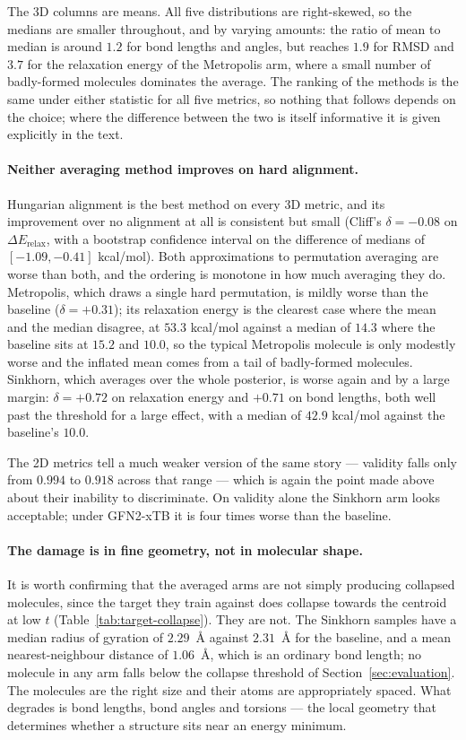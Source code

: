 The 3D columns are means. All five distributions are right-skewed, so the medians are smaller
throughout, and by varying amounts: the ratio of mean to median is around $1.2$ for bond lengths
and angles, but reaches $1.9$ for RMSD and $3.7$ for the relaxation energy of the Metropolis arm,
where a small number of badly-formed molecules dominates the average. The ranking of the methods is
the same under either statistic for all five metrics, so nothing that follows depends on the
choice; where the difference between the two is itself informative it is given explicitly in the
text.

\paragraph{Neither averaging method improves on hard alignment.}
Hungarian alignment is the best method on every 3D metric, and its improvement over no alignment at
all is consistent but small (Cliff's $\delta = -0.08$ on $\Delta E_{\text{relax}}$, with a bootstrap
confidence interval on the difference of medians of $[-1.09, -0.41]$ kcal/mol). Both approximations
to permutation averaging are worse than both, and the ordering is monotone in how much averaging
they do. Metropolis, which draws a single hard permutation, is mildly worse than the baseline
($\delta = +0.31$); its relaxation energy is the clearest case where the mean and the median
disagree, at $53.3$ kcal/mol against a median of $14.3$ where the baseline sits at $15.2$ and
$10.0$, so the typical Metropolis molecule is only modestly worse and the inflated mean comes from a
tail of badly-formed molecules. Sinkhorn, which averages over the whole posterior, is worse again
and by a large margin: $\delta = +0.72$ on relaxation energy and $+0.71$ on bond lengths, both well
past the threshold for a large effect, with a median of $42.9$ kcal/mol against the baseline's
$10.0$.

The 2D metrics tell a much weaker version of the same story --- validity falls only from $0.994$ to
$0.918$ across that range --- which is again the point made above about their inability to
discriminate. On validity alone the Sinkhorn arm looks acceptable; under GFN2-xTB it is four times
worse than the baseline.

\paragraph{The damage is in fine geometry, not in molecular shape.}
It is worth confirming that the averaged arms are not simply producing collapsed molecules, since
the target they train against does collapse towards the centroid at low $t$
(Table~\ref{tab:target-collapse}). They are not. The Sinkhorn samples have a median radius of
gyration of $2.29$~\AA{} against $2.31$~\AA{} for the baseline, and a mean nearest-neighbour
distance of $1.06$~\AA{}, which is an ordinary bond length; no molecule in any arm falls below the
collapse threshold of Section~\ref{sec:evaluation}. The molecules are the right size and their atoms
are appropriately spaced. What degrades is bond lengths, bond angles and torsions --- the local
geometry that determines whether a structure sits near an energy minimum.

